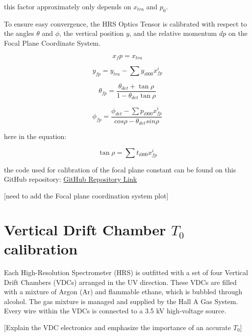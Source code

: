 this factor approximately only depends on $x_{tra}$ and $p_0$.

To ensure easy convergence, the HRS Optics Tensor is calibrated with respect to the angles $\theta$ and $\phi$, the vertical position $y$, and the relative momentum $dp$ on the Focal Plane Coordinate System.

\begin{equation}
    x_fp = x_{tra}    \label{eq:cpt3_fps_1}
\end{equation}

\begin{equation}
    y_{fp} = y_{tra} - \sum y_{i000}x^i_{fp}  
\end{equation}

\begin{equation}
\theta_{fp} = \frac{\theta_{det} + \tan\rho}{1 - \theta_{det}\tan\rho}
\end{equation}


\begin{equation}
    \phi_{fp} = \frac{\phi_{det} - \sum p_{i000}x^i_{fp}}{cos \rho - \theta_{det} sin\rho}
\end{equation}

here  in the equation:

\begin{equation}
    \tan\rho  = \sum t_{i000}x^i_{fp} \label{eq:cpt3_fps_5}
\end{equation}


the code used for calibration of the focal plane constant can be found on this GitHub repository: \href{https://github.com/Jiansiyu/GeneralScripts/blob/master/vdcConstantOpt}{GitHub Repository Link}


[need to add the Focal plane coordination system plot]


\section{Vertical Drift Chamber $T_0$ calibration}

Each High-Resolution Spectrometer (HRS) is outfitted with a set of four Vertical Drift Chambers (VDCs) arranged in the UV direction. These VDCs are filled with a mixture of Argon (Ar) and flammable ethane, which is bubbled through alcohol. The gas mixture is managed and supplied by the Hall A Gas System. Every wire within the VDCs is connected to a 3.5 kV high-voltage source.

[Explain the VDC electronics and emphasize the importance of an accurate $T_0$]

